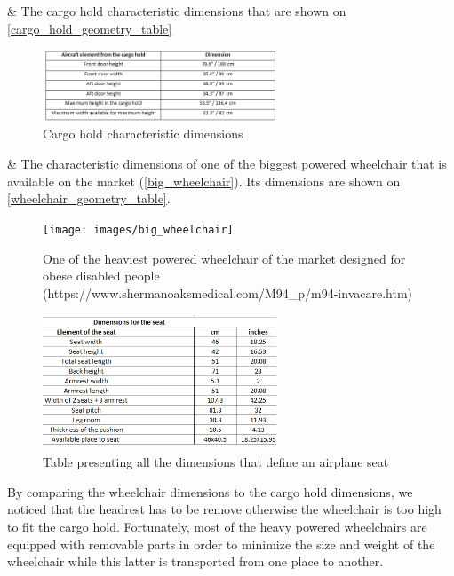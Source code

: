 \begin{easylist}

& The cargo hold characteristic dimensions that are shown on \ref{cargo_hold_geometry_table} 

\begin{figure}[h]
\centering
\includegraphics[width=7cm]{images/cargo_hold_geometry_table}
\caption{Cargo hold characteristic dimensions}
\label{fig: cargo_hold_geometry_table }
\end{figure}

& The characteristic dimensions of one of the biggest powered wheelchair that is available on the market (\ref{big_wheelchair}). Its dimensions are shown on \ref{wheelchair_geometry_table}.

\begin{figure}[h]
\centering
\texttt{[image: images/big\_wheelchair]}
\caption{One of the heaviest powered wheelchair of the market designed for obese disabled people (https://www.shermanoaksmedical.com/M94_p/m94-invacare.htm)}
\label{fig: big_wheelchair}
\end{figure}

\begin{figure}[h]
\centering
\includegraphics[width=7cm]{images/seat_dimensions_table}
\caption{Table presenting all the dimensions that define an airplane seat}
\label{fig: seat_dimensions_table}
\end{figure}

\end{easylist}

By comparing the wheelchair dimensions to the cargo hold dimensions, we noticed that the headrest has to be remove otherwise the wheelchair is too high to fit the cargo hold. Fortunately, most of the heavy powered wheelchairs are equipped with removable parts in order to minimize the size and weight of the wheelchair while this latter is transported from one place to another.

